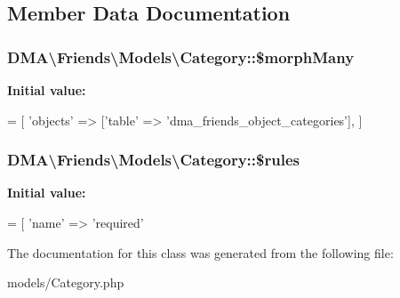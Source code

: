 \subsection{Member Data Documentation}
\hypertarget{classDMA_1_1Friends_1_1Models_1_1Category_a50575142a249c510106a75d42b71391b}{
\subsubsection[{\$morph\+Many}]{\setlength{\rightskip}{0pt plus 5cm}D\+M\+A\textbackslash{}\+Friends\textbackslash{}\+Models\textbackslash{}\+Category\+::\$morph\+Many}}\label{classDMA_1_1Friends_1_1Models_1_1Category_a50575142a249c510106a75d42b71391b}
{\bfseries Initial value\+:}
\begin{DoxyCode}
= [ 
        \textcolor{stringliteral}{'objects'} => [\textcolor{stringliteral}{'table'} => \textcolor{stringliteral}{'dma\_friends\_object\_categories'}],
    ]
\end{DoxyCode}
\hypertarget{classDMA_1_1Friends_1_1Models_1_1Category_ad99b16f55603d86e0a22fa60c22c7300}{
\subsubsection[{\$rules}]{\setlength{\rightskip}{0pt plus 5cm}D\+M\+A\textbackslash{}\+Friends\textbackslash{}\+Models\textbackslash{}\+Category\+::\$rules}}\label{classDMA_1_1Friends_1_1Models_1_1Category_ad99b16f55603d86e0a22fa60c22c7300}
{\bfseries Initial value\+:}
\begin{DoxyCode}
= [ 
        \textcolor{stringliteral}{'name'} => \textcolor{stringliteral}{'required'}
\end{DoxyCode}


The documentation for this class was generated from the following file\+:\begin{DoxyCompactItemize}
\item 
models/Category.\+php\end{DoxyCompactItemize}
